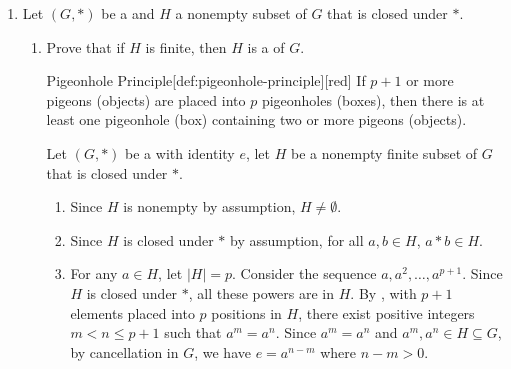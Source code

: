 \begin{enumerate}
\begin{enumerate}
    \begin{subdisprove}
      Let \(G = S_{3}\), the  of degree \(3\), 
      which is a nonabelian . 
      Let \(H = \{a \in S_{3} \mid a^{2} = e\}\), where \(e\) is the identity permutation.
      The elements of \(S_{3}\) satisfying \(a^{2} = e\) are \(e, f, f g, g f\) 
      where \(f = (1,2)\) and \(g = (1,3,2)\), so \(H = \{e, f, f g, g f\}\).
      However, \(f \in H\) and \(f g \in H\), but \(f \cdot (f g) = g \notin H\) 
      since \(g^{2} \neq e\). 
      Thus, \(H\) is not closed under composition, 
      so \(H\) is not a  of \(S_{3}\) by .\proofstep
      Therefore, by counterexample, the statement is false when \(G\) is nonabelian.
    \end{subdisprove}
  \end{enumerate}
  \item Let \((G, *)\) be a  and \(H\) a nonempty subset of \(G\) that is closed under \(*\).
  \begin{enumerate}
    \item Prove that if \(H\) is finite, then \(H\) is a  of \(G\).
    \begin{define}{Pigeonhole Principle}[def:pigeonhole-principle][red]
      If \(p+1\) or more pigeons (objects) are placed into \(p\) pigeonholes (boxes), 
      then there is at least one pigeonhole (box) containing two or more pigeons (objects).
    \end{define}
    \begin{subprove}
      Let \((G, *)\) be a  with identity \(e\), let \(H\) be a nonempty finite subset of \(G\) that is closed under \(*\).
      \begin{enumerate}
        \item Since \(H\) is nonempty by assumption, \(H \neq \emptyset\).
        \item Since \(H\) is closed under \(*\) by assumption, for all \(a, b \in H\), \(a * b \in H\).
        \item For any \(a \in H\), let \(|H| = p\). Consider the sequence \(a, a^{2}, \ldots, a^{p+1}\). Since \(H\) is closed under \(*\), all these powers are in \(H\). By , with \(p+1\) elements placed into \(p\) positions in \(H\), there exist positive integers \(m < n \leq p+1\) such that \(a^{m} = a^{n}\).
        Since \(a^{m} = a^{n}\) and \(a^{m}, a^{n} \in H \subseteq G\), by cancellation in \(G\), we have \(e = a^{n-m}\) where \(n - m > 0\).

\end{enumerate}
\end{subprove}
\end{enumerate}
\end{enumerate}
